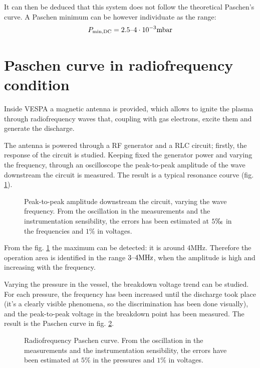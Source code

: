 \documentclass[11pt,a4 paper]{article}
\begin{document}
It can then be deduced that this system does not follow the theoretical Paschen's curve. A Paschen minimum can be however individuate as the range:
\begin{equation*}
  P_{\text{min,DC}} = 2.5\textup{--}4\cdot10^{-3}\si{\milli\bar}
\end{equation*}

\section{Paschen curve in radiofrequency condition}
Inside VESPA a magnetic antenna is provided, which allows to ignite the plasma through radiofrequency waves that, coupling with gas electrons, excite them and generate the discharge.

The antenna is powered through a RF generator and a RLC circuit; firstly, the response of the circuit is studied. Keeping fixed the generator power and varying the frequency, through an oscilloscope the peak-to-peak amplitude of the wave downstream the circuit is measured. The result is a typical resonance courve (fig. \ref{fig:RF:response}).

\begin{figure}[H]
  \centering
  \caption{Peak-to-peak amplitude downstream the circuit, varying the wave frequency.  From the oscillation in the measurements and the instrumentation sensibility, the errors has been estimated at $5\tcperthousand$ in the frequencies and $1\%$ in voltages.}
  \label{fig:RF:response}
\end{figure}

From the fig. \ref{fig:RF:response} the maximum can be detected: it is around $4\si{\mega\hertz}$. Therefore the operation area is identified in the range $3\textup{--}4\si{\mega\hertz}$, when the amplitude is high and increasing with the frequency.

Varying the pressure in the vessel, the breakdown voltage trend can be studied. For each pressure, the frequency has been increased until the discharge took place (it's a clearly visible phenomena, so the discrimination has been done visually), and the peak-to-peak voltage in the breakdown point has been measured. The result is the Paschen curve in fig. \ref{fig:RF:Paschen}.

\begin{figure}[H]
  \centering
  \caption{Radiofrequency Paschen curve. From the oscillation in the measurements and the instrumentation sensibility, the errors have been estimated at $5\%$ in the pressures and $1\%$ in voltages.}
  \label{fig:RF:Paschen}
\end{figure}
\end{document}
